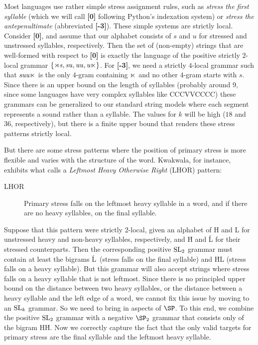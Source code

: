 Most languages use rather simple stress assignment rules, such as \emph{stress the first syllable} (which we will call \textbf{[0]} following Python's indexation system) or \emph{stress the antepenultimate} (abbreviated \textbf{[-3]}).
These simple systems are strictly local.
Consider \textbf{[0]}, and assume that our alphabet consists of $s$ and $u$ for stressed and unstressed syllables, respectively.
Then the set of (non-empty) strings that are well-formed with respect to \textbf{[0]} is exactly the language of the positive strictly $2$-local grammar $\left \{ \mathit{\rtimes s}, \mathit{su}, \mathit{uu}, \mathit{u\ltimes} \right \}$.
For \textbf{[-3]}, we need a strictly $4$-local grammar such that $\mathit{suu\ltimes}$ is the only $4$-gram containing $\ltimes$ and no other $4$-gram starts with $s$.
%
Since there is an upper bound on the length of syllables (probably around 9, since some languages have very complex syllables like CCCVVCCCC) these grammars can be generalized to our standard string models where each segment represents a sound rather than a syllable.
The values for $k$ will be high ($18$ and $36$, respectively), but there is a finite upper bound that renders these stress patterns strictly local.

But there are some stress patterns where the position of primary stress is more flexible and varies with the structure of the word.
Kwakwala, for instance, exhibits what \citet{Hayes95} calls a \emph{Leftmost Heavy Otherwise Right} (LHOR) pattern:
%
\begin{description}
    \item[LHOR] Primary stress falls on the leftmost heavy syllable in a word, and if there are no heavy syllables, on the final syllable.
\end{description}
%
Suppose that this pattern were strictly 2-local, given an alphabet of H and L for unstressed heavy and non-heavy syllables, respectively, and \'{H} and \'{L} for their stressed counterparts.
Then the corresponding positive $\mathrm{SL}_2$ grammar must contain at least the bigrams \'{L}\RightEdge\ (stress falls on the final syllable) and \'{H}L (stress falls on a heavy syllable).
But this grammar will also accept strings where stress falls on a heavy syllable that is not leftmost.
Since there is no principled upper bound on the distance between two heavy syllables, or the distance between a heavy syllable and the left edge of a word, we cannot fix this issue by moving to an $\mathrm{SL}_k$ grammar.
So we need to bring in aspects of $\SP$.
To this end, we combine the positive $\mathrm{SL}_2$ grammar with a negative $\SP_2$ grammar that consists only of the bigram H\'{H}.
Now we correctly capture the fact that the only valid targets for primary stress are the final syllable and the leftmost heavy syllable.

